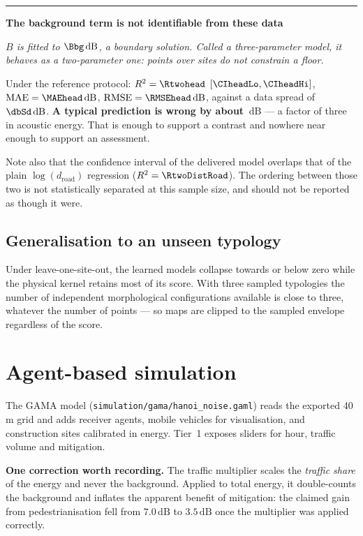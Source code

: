 \documentclass[11pt,a4paper]{article}
\newcommand{\dB}{\ensuremath{\,\mathrm{dB}}}
\newenvironment{caveat}[1]
  {\par\medskip\noindent\begin{minipage}{\linewidth}%
   \color{warnc}\rule{2pt}{\baselineskip}\hspace{.6em}\textbf{#1}\par\vspace{.2em}
   \hspace*{1.4em}\begin{minipage}{\dimexpr\linewidth-1.4em\relax}\small\itshape}
  {\end{minipage}\end{minipage}\par\medskip}
\begin{document}
\begin{caveat}{The background term is not identifiable from these data}
  $B$ is fitted to $\Bbg\dB$, a boundary solution. Called a three-parameter
  model, it behaves as a two-parameter one: \nMeas{} points over \nSites{} sites
  do not constrain a floor.
\end{caveat}

\noindent
Under the reference protocol: $R^2 = \Rtwohead$ $[\CIheadLo, \CIheadHi]$,
$\mathrm{MAE} = \MAEhead\dB$, $\mathrm{RMSE} = \RMSEhead\dB$, against a data
spread of $\dbSd\dB$. \textbf{A typical prediction is wrong by about
\MAEhead\dB{}} --- a factor of three in acoustic energy. That is enough to
support a contrast and nowhere near enough to support an assessment.

\medskip\noindent
Note also that the confidence interval of the delivered model overlaps that of
the plain $\log(d_\mathrm{road})$ regression ($R^2 = \RtwoDistRoad$). The
ordering between those two is not statistically separated at this sample size,
and should not be reported as though it were.

\subsection{Generalisation to an unseen typology}

Under leave-one-site-out, the learned models collapse towards or below zero while
the physical kernel retains most of its score. With three sampled typologies the
number of independent morphological configurations available is close to three,
whatever the number of points --- so maps are clipped to the sampled envelope
regardless of the score.

\clearpage
\section{Agent-based simulation}

The GAMA model (\texttt{simulation/gama/hanoi\_noise.gaml}) reads the exported
40\,m grid and adds receiver agents, mobile vehicles for visualisation, and
construction sites calibrated in energy. Tier~1 exposes sliders for hour, traffic
volume and mitigation.

\medskip\noindent
\textbf{One correction worth recording.} The traffic multiplier scales the
\emph{traffic share} of the energy and never the background. Applied to total
energy, it double-counts the background and inflates the apparent benefit of
mitigation: the claimed gain from pedestrianisation fell from $7.0\dB$ to
$3.5\dB$ once the multiplier was applied correctly.
\end{document}
